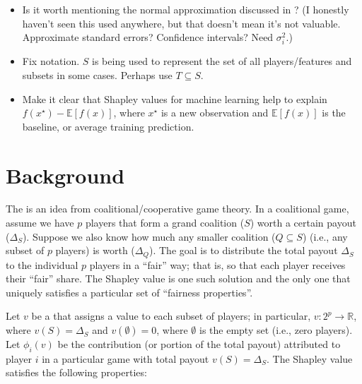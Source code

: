\begin{itemize}
  \item Is it worth mentioning the normal approximation discussed in \citet{strumbelj-2014-explaining}? (I honestly haven't seen this used anywhere, but that doesn't mean it's not valuable. Approximate standard errors? Confidence intervals? Need $\sigma_i ^ 2$.)
  
  \item Fix notation. $S$ is being used to represent the set of all players/features and subsets in some cases. Perhaps use $T \subseteq S$.
  
  \item Make it clear that Shapley values for machine learning help to explain $f\left(x^\star\right) - \mathbb{E}\left[f\left(x\right)\right]$, where $x^\star$ is a new observation and $\mathbb{E}\left[f\left(x\right)\right]$ is the baseline, or average training prediction.

\end{itemize}

\section{Background}

The  \citep{shapley-2016-value} is an idea from
coalitional/cooperative game theory. In a coalitional game, assume we
have \(p\) players that form a grand coalition (\(S\)) worth a certain
payout (\(\Delta_S\)). Suppose we also know how much any smaller
coalition (\(Q \subseteq S\)) (i.e., any subset of \(p\) players) is
worth (\(\Delta_Q\)). The goal is to distribute the total payout
\(\Delta_S\) to the individual \(p\) players in a ``fair'' way; that is,
so that each player receives their ``fair'' share. The Shapley value is
one such solution and the only one that uniquely satisfies a particular
set of ``fairness properties''.

Let \(v\) be a  that assigns a value to
each subset of players; in particular,
\(v : 2^p \rightarrow \mathbb{R}\), where \(v\left(S\right) = \Delta_S\)
and \(v\left(\emptyset\right) = 0\), where \(\emptyset\) is the empty
set (i.e., zero players). Let \(\phi_i\left(v\right)\) be the
contribution (or portion of the total payout) attributed to player \(i\)
in a particular game with total payout \(v\left(S\right) = \Delta_S\).
The Shapley value satisfies the following properties:

